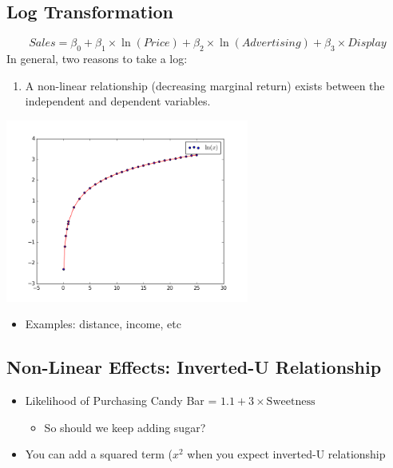 \documentclass[10pt,article]{article}
\begin{document}
\subsection{Log Transformation}
\label{sec:orgde0a402}
\[ Sales = \beta_0 + \beta_1 \times \ln(Price) + \beta_2 \times
           \ln(Advertising) + \beta_3 \times Display \]
In general, two reasons to take a log:

\begin{enumerate}
\item A non-linear relationship (decreasing marginal return) exists between the
independent and dependent variables.
\end{enumerate}

\begin{center}
\includegraphics[width=8cm]{../../../Assets/Images/Regression/ln_x.png}
\end{center}

\begin{itemize}
\item Examples: distance, income, etc
\end{itemize}



\subsection{Non-Linear Effects: Inverted-U Relationship}
\label{sec:orga127e34}
\begin{itemize}
\item Likelihood of Purchasing Candy Bar = \(1.1 + 3 \times \text{Sweetness}\)

\begin{itemize}
\item So should we keep adding sugar?
\end{itemize}

\item You can add a squared term (\(x^{2}\) when you expect inverted-U relationship
\end{itemize}
\end{document}
